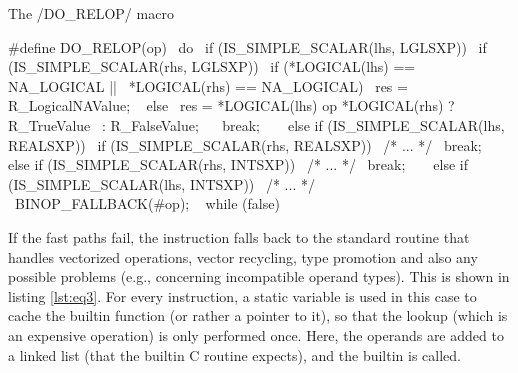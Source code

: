 \begin{listing}[htbp]
  \caption{\label{lst:eq2}The \cinline/DO_RELOP/ macro}
  \begin{ccode}
#define DO_RELOP(op)                                                  \
do {                                                                  \
  if (IS_SIMPLE_SCALAR(lhs, LGLSXP)) {                                \
    if (IS_SIMPLE_SCALAR(rhs, LGLSXP)) {                              \
      if (*LOGICAL(lhs) == NA_LOGICAL ||                              \
          *LOGICAL(rhs) == NA_LOGICAL) {                              \
        res = R_LogicalNAValue;                                       \
      } else {                                                        \
        res = *LOGICAL(lhs) op *LOGICAL(rhs) ? R_TrueValue            \
                                             : R_FalseValue;          \
      }                                                               \
      break;                                                          \
    }                                                                 \
  } else if (IS_SIMPLE_SCALAR(lhs, REALSXP)) {                        \
    if (IS_SIMPLE_SCALAR(rhs, REALSXP)) {                             \
      /* ... */                                                       \
      break;                                                          \
    } else if (IS_SIMPLE_SCALAR(rhs, INTSXP)) {                       \
      /* ... */                                                       \
      break;                                                          \
    }                                                                 \
  } else if (IS_SIMPLE_SCALAR(lhs, INTSXP)) {                         \
    /* ... */                                                         \
  }                                                                   \
  BINOP_FALLBACK(#op);                                                \
} while (false)
  \end{ccode}
\end{listing}

If the fast paths fail, the instruction falls back to the standard routine that handles vectorized operations, vector recycling, type promotion and also any possible problems (e.g., concerning incompatible operand types). This is shown in listing \ref{lst:eq3}. For every instruction, a static variable is used in this case to cache the builtin function (or rather a pointer to it), so that the lookup (which is an expensive operation) is only performed once. Here, the operands are added to a linked list (that the builtin C routine expects), and the builtin is called.

